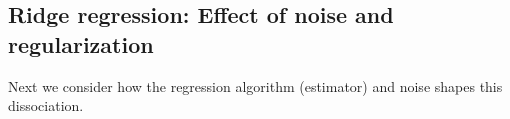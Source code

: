 \documentclass{article}
\theoremstyle{plain}
\theoremstyle{definition}
\theoremstyle{remark}
\begin{document}


\subsection{Ridge regression: Effect of noise and regularization}
\label{sec:pixel-ridge}
Next we consider how the regression algorithm (estimator) and noise shapes this dissociation.
\end{document}
